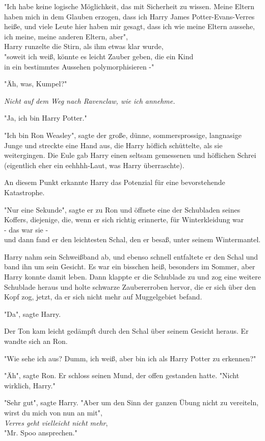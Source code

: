 {"Ich habe keine logische Möglichkeit, das mit Sicherheit zu wissen. Meine Eltern haben mich in dem Glauben erzogen, dass ich Harry James Potter-Evans-Verres heiße, und viele Leute hier haben mir gesagt, dass ich wie meine Eltern aussehe, ich meine, meine anderen Eltern, aber",\\ Harry runzelte die Stirn, als ihm etwas klar wurde,\\ "soweit ich weiß, könnte es leicht Zauber geben, die ein Kind\\ in ein bestimmtes Aussehen polymorphisieren -"

"Äh, was, Kumpel?"

\emph{Nicht auf dem Weg nach Ravenclaw, wie ich annehme.}

"Ja, ich bin Harry Potter."

"Ich bin Ron Weasley", sagte der große, dünne, sommersprossige, langnasige Junge und streckte eine Hand aus, die Harry höflich schüttelte, als sie weitergingen. Die Eule gab Harry einen seltsam gemessenen und höflichen Schrei (eigentlich eher ein eehhhh-Laut, was Harry überraschte).

An diesem Punkt erkannte Harry das Potenzial für eine bevorstehende Katastrophe.

"Nur eine Sekunde", sagte er zu Ron und öffnete eine der Schubladen seines Koffers, diejenige, die, wenn er sich richtig erinnerte, für Winterkleidung war\\ - das war sie -\\ und dann fand er den leichtesten Schal, den er besaß, unter seinem Wintermantel.

Harry nahm sein Schweißband ab, und ebenso schnell entfaltete er den Schal und band ihn um sein Gesicht. Es war ein bisschen heiß, besonders im Sommer, aber Harry konnte damit leben. Dann klappte er die Schublade zu und zog eine weitere Schublade heraus und holte schwarze Zaubererroben hervor, die er sich über den Kopf zog, jetzt, da er sich nicht mehr auf Muggelgebiet befand.

"Da", sagte Harry.

Der Ton kam leicht gedämpft durch den Schal über seinem Gesicht heraus. Er wandte sich an Ron.

"Wie sehe ich aus? Dumm, ich weiß, aber bin ich als Harry Potter zu erkennen?"

"Äh", sagte Ron. Er schloss seinen Mund, der offen gestanden hatte. "Nicht wirklich, Harry."

"Sehr gut", sagte Harry. "Aber um den Sinn der ganzen Übung nicht zu vereiteln, wirst du mich von nun an mit",\\ \emph{Verres geht vielleicht nicht mehr},\\ "Mr. Spoo ansprechen."

}
